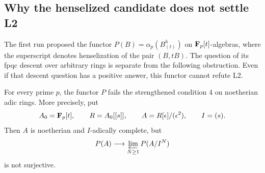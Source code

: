 \subsection{Why the henselized candidate does not settle L2}

The first run proposed the functor
$P(B)=\alpha_p(B^h_{(t)})$ on $\mathbf F_p[t]$-algebras, where the
superscript denotes henselization of the pair $(B,tB)$.
The question of its fpqc descent over arbitrary rings is separate
from the following obstruction. Even if that descent question has
a positive answer, this functor cannot refute L2.

\begin{proposition}\label{A:hensel-adic-failure}
For every prime $p$, the functor $P$ fails the strengthened
condition 4 on noetherian adic rings. More precisely, put
\[
 A_0=\mathbf F_p[t],\qquad R=A_0[[s]],\qquad
 A=R[\epsilon]/(\epsilon^2),\qquad I=(s).
\]
Then $A$ is noetherian and $I$-adically complete, but
\[
 P(A)\longrightarrow\varprojlim_{N\geq1}P(A/I^N)
\]
is not surjective.
\end{proposition}
